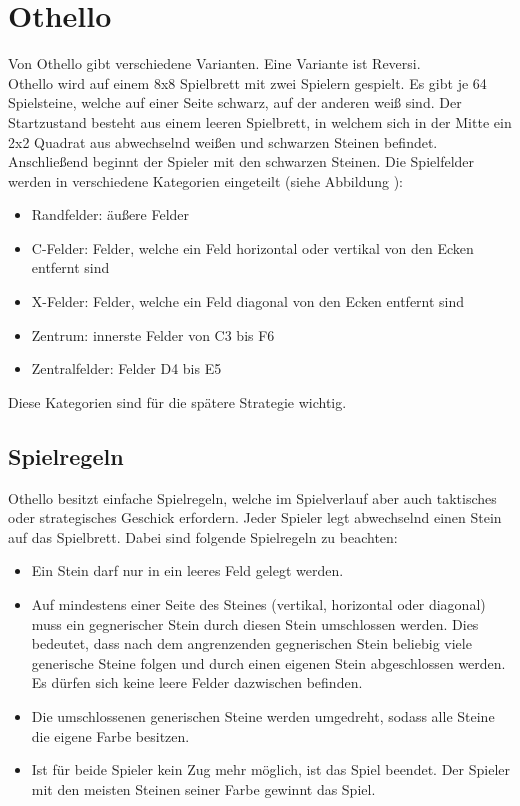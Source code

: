 \chapter{Othello}
\label{othello-chapter}
Von Othello gibt verschiedene Varianten. Eine Variante ist Reversi.
\\Othello wird auf einem 8x8 Spielbrett mit zwei Spielern gespielt. Es gibt je 64 Spielsteine, welche auf einer Seite schwarz, auf der anderen weiß sind. Der Startzustand besteht aus einem leeren Spielbrett, in welchem sich in der Mitte ein 2x2 Quadrat aus abwechselnd weißen und schwarzen Steinen befindet. Anschließend beginnt der Spieler mit den schwarzen Steinen.
Die Spielfelder werden in verschiedene Kategorien eingeteilt (siehe Abbildung ):
\begin{itemize}
\item Randfelder: äußere Felder
\item C-Felder: Felder, welche ein Feld horizontal oder vertikal von den Ecken entfernt sind
\item X-Felder: Felder, welche ein Feld diagonal von den Ecken entfernt sind
\item Zentrum: innerste Felder von C3 bis F6
\item Zentralfelder: Felder D4 bis E5
\end{itemize}
Diese Kategorien sind für die spätere Strategie wichtig.
\section{Spielregeln}
Othello besitzt einfache Spielregeln, welche im Spielverlauf aber auch taktisches oder strategisches Geschick erfordern. Jeder Spieler legt abwechselnd einen Stein auf das Spielbrett. Dabei sind folgende Spielregeln zu beachten:
\begin{itemize}
\item Ein Stein darf nur in ein leeres Feld gelegt werden.
\item Auf mindestens einer Seite des Steines (vertikal, horizontal oder diagonal) muss ein gegnerischer Stein durch diesen Stein umschlossen werden. Dies bedeutet, dass nach dem angrenzenden gegnerischen Stein beliebig viele generische Steine folgen und durch einen eigenen Stein abgeschlossen werden. Es dürfen sich keine leere Felder dazwischen befinden.
\item Die umschlossenen generischen Steine werden umgedreht, sodass alle Steine die eigene Farbe besitzen.
\item Ist für beide Spieler kein Zug mehr möglich, ist das Spiel beendet. Der Spieler mit den meisten Steinen seiner Farbe gewinnt das Spiel.
\end{itemize}
